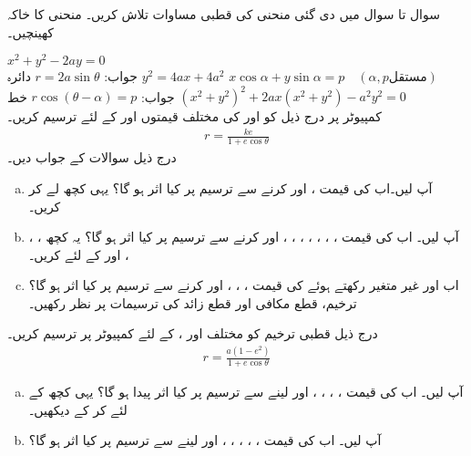 سوال  تا سوال  میں دی گئی منحنی کی قطبی مساوات تلاش کریں۔ منحنی کا خاکہ کھینچیں۔

$x^2+y^2-2ay=0$\\
جواب:\quad
$r=2a\sin\theta$\quad
دائرہ
$y^2=4ax+4a^2$
$x\cos\alpha+y\sin\alpha=p\quad (\alpha, p \text{مستقل})$\\
جواب:\quad
$r\cos(\theta-\alpha)=p$\quad
خط
$(x^2+y^2)^2+2ax(x^2+y^2)-a^2y^2=0$
\\
کمپیوٹر پر درج ذیل کو  اور  کی مختلف قیمتوں اور  کے لئے ترسیم کریں۔
\begin{align*}
r=\frac{ke}{1+e\cos\theta}
\end{align*}
درج ذیل سوالات کے جواب دیں۔
\begin{enumerate}[a.]
\item
آپ  لیں۔اب  کی قیمت ،  اور  کرنے سے ترسیم پر کیا اثر ہو گا؟ یہی کچھ  لے کر کریں۔ 
\item
آپ  لیں۔ اب  کی قیمت ، ، ، ، ، ، ،  اور  کرنے سے ترسیم پر کیا اثر ہو گا؟ یہ کچھ ، ، ،  اور  کے لئے کریں۔
\item
اب  اور غیر متغیر رکھتے ہوئے  کی قیمت ، ، ،  اور  کرنے سے ترسیم پر کیا اثر ہو گا؟ ترخیم، قطع مکافی اور قطع زائد کی ترسیمات پر نظر رکھیں۔
\end{enumerate}
درج ذیل قطبی ترخیم کو مختلف اور ،  کے لئے  کمپیوٹر پر ترسیم کریں۔
\begin{align*}
r=\frac{a(1-e^2)}{1+e\cos\theta}
\end{align*}
\begin{enumerate}[a.]
\item
آپ  لیں۔ اب  کی قیمت ، ، ، ،  اور  لینے سے ترسیم پر کیا اثر پیدا ہو گا؟ یہی کچھ  کے لئے کر کے دیکھیں۔
\item
آپ لیں۔ اب  کی قیمت ، ، ، ، ،  اور  لینے سے ترسیم  پر کیا اثر ہو گا؟
\end{enumerate}

